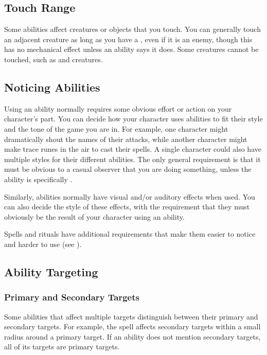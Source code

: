   \subsection{Touch Range}
    Some abilities affect creatures or objects that you touch.
    You can generally touch an adjacent creature as long as you have a , even if it is an enemy, though this has no mechanical effect unless an ability says it does.
    Some creatures cannot be touched, such as  and  creatures.

  \subsection{Noticing Abilities}
    Using an ability normally requires some obvious effort or action on your character's part.
    You can decide how your character uses abilities to fit their style and the tone of the game you are in.
    For example, one character might dramatically shout the names of their attacks, while another character might make trace runes in the air to cast their spells.
    A single character could also have multiple styles for their different abilities.
    The only general requirement is that it must be obvious to a casual observer that you are doing something, unless the ability is specifically .

    Similarly, abilities normally have visual and/or auditory effects when used.
    You can also decide the style of these effects, with the requirement that they must obviously be the result of your character using an ability.

    Spells and rituals have additional requirements that make them easier to notice and harder to use (see ).

  \subsection{Ability Targeting}\label{Ability Targeting}

    \subsubsection{Primary and Secondary Targets}\label{Primary and Secondary Targets}
      Some abilities that affect multiple targets distinguish between their primary and secondary targets.
      For example, the  spell affects secondary targets within a small radius around a primary target.
      If an ability does not mention secondary targets, all of its targets are primary targets.

